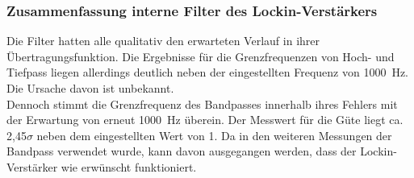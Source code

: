 \documentclass[12pt,a4paper]{article}
\begin{document}
\subsubsection{Zusammenfassung interne Filter des Lockin-Verstärkers}
Die Filter hatten alle qualitativ den erwarteten Verlauf in ihrer Übertragungsfunktion. Die Ergebnisse für die Grenzfrequenzen von Hoch- und Tiefpass liegen allerdings deutlich neben der eingestellten Frequenz von \SI{1000}{Hz}. Die Ursache davon ist unbekannt. \\
Dennoch stimmt die Grenzfrequenz des Bandpasses innerhalb ihres Fehlers mit der Erwartung von erneut \SI{1000}{Hz} überein. Der Messwert für die Güte liegt ca. 2,45$\sigma$ neben dem eingestellten Wert von 1. Da in den weiteren Messungen der Bandpass verwendet wurde, kann davon ausgegangen werden, dass der Lockin-Verstärker wie erwünscht funktioniert.
\end{document}
